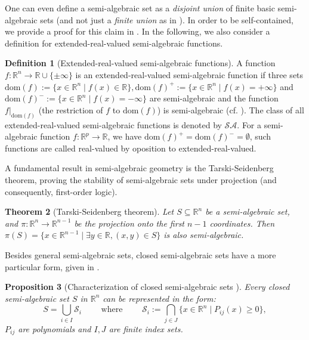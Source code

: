 \documentclass{article}
\newcommand*{\cS}{\mathcal{S}}
\newcommand*{\RR}{\mathbb{R}}
\newcommand{\SA}{\mathcal{SA}}
\newcommand{\dom}{\mathrm{dom}}
\theoremstyle{plain}
\newtheorem{theorem}{Theorem}[section]
\newtheorem{proposition}[theorem]{Proposition}
\theoremstyle{definition}
\newtheorem{definition}[theorem]{Definition}
\begin{document}
One can even define a semi-algebraic set as a \emph{disjoint union} of finite basic semi-algebraic sets (and not just a \emph{finite union} as in ). In order to be self-contained, we provide a proof for this claim in . In the following, we also consider a definition for extended-real-valued semi-algebraic functions. 

\begin{definition}[Extended-real-valued semi-algebraic functions]
    \label{def:extended-semi-algebraic-function}
    A function $f: \RR^n \to \RR \cup \{\pm \infty\}$ is an extended-real-valued semi-algebraic function if three sets $\dom(f) := \{x \in \RR^n \mid f(x) \in \RR\}, \dom(f)^+:= \{x \in \RR^n \mid f(x) = +\infty\}$ and $\dom(f)^-:= \{x \in \RR^n \mid f(x) = -\infty\}$ are semi-algebraic and the function $f|_{\dom(f)}$ (the restriction of $f$ to $\dom(f)$) is semi-algebraic (cf. ). The class of all extended-real-valued semi-algebraic functions is denoted by $\SA$. For a semi-algebraic function $f \colon \RR^p \to \RR$, we have  $\dom(f)^+ = \dom(f)^- = \emptyset$, such functions are called real-valued by oposition to extended-real-valued.
\end{definition}

 A fundamental result in semi-algebraic geometry is the Tarski-Seidenberg theorem, proving the stability of semi-algebraic sets under projection (and consequently, first-order logic).

\begin{theorem}[Tarski-Seidenberg theorem]
    \label{theorem:projection-theorem}
    Let $S \subseteq \RR^n$ be a semi-algebraic set, and $\pi: \RR^n \to \RR^{n-1}$ be the projection onto the first $n-1$ coordinates. Then $\pi(S) = \{x \in \RR^{n - 1} \mid \exists y \in \RR, (x,y) \in S\}$ is also semi-algebraic.
\end{theorem}

Besides general semi-algebraic sets, closed semi-algebraic sets have a more particular form, given in .
\begin{proposition}[Characterization of closed semi-algebraic sets {\cite[Exercise 2.5.7]{benedetti1990real}}]
    \label{lemma:closed-semi-algebraic-set}
    Every \emph{closed} semi-algebraic set $S$ in $\RR^n$ can be represented in the form:
    \begin{equation}
        \label{eq:form-of-closed-semi-algebraic-sets}
        S = \bigcup_{i \in I} {\cS_i \qquad \text{ where } \qquad \cS_i :=} \bigcap_{j \in J} \{x \in \RR^n \mid P_{ij}(x) \geq 0\},
    \end{equation}
    $P_{ij}$ are polynomials and $I,J$ are finite index sets.
\end{proposition}
\end{document}
